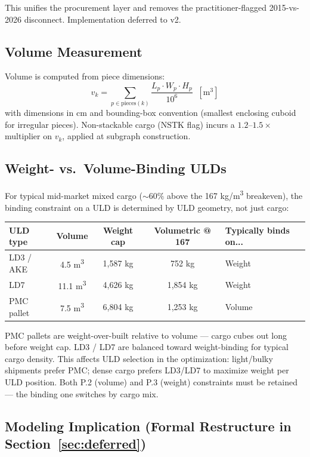 \documentclass[11pt,a4paper]{article}
\theoremstyle{definition}
\begin{document}
This unifies the procurement layer and removes the practitioner-flagged
2015-vs-2026 disconnect. Implementation deferred to v2.

\subsection{Volume Measurement}

Volume is computed from piece dimensions:
\begin{equation*}
  v_k = \sum_{p \in \text{pieces}(k)} \frac{L_p \cdot W_p \cdot H_p}{10^6} \;\;[\text{m}^3]
\end{equation*}
with dimensions in cm and bounding-box convention (smallest enclosing cuboid for
irregular pieces). Non-stackable cargo (NSTK flag) incurs a \(1.2\)--\(1.5\times\)
multiplier on \(v_k\), applied at subgraph construction.

\subsection{Weight- vs.\ Volume-Binding ULDs}

For typical mid-market mixed cargo (\(\sim 60\%\) above the 167 kg/m\textsuperscript{3}
breakeven), the binding constraint on a ULD is determined by ULD geometry, not just
cargo:

\begin{center}
\begin{tabular}{lcccl}
\toprule
ULD type & Volume & Weight cap & Volumetric @ 167 & Typically binds on... \\
\midrule
LD3 / AKE & 4.5 m\textsuperscript{3} & 1{,}587 kg & 752 kg & Weight \\
LD7       & 11.1 m\textsuperscript{3} & 4{,}626 kg & 1{,}854 kg & Weight \\
PMC pallet & 7.5 m\textsuperscript{3} & 6{,}804 kg & 1{,}253 kg & Volume \\
\bottomrule
\end{tabular}
\end{center}

PMC pallets are weight-over-built relative to volume — cargo cubes out long before
weight cap. LD3 / LD7 are balanced toward weight-binding for typical cargo density.
This affects ULD selection in the optimization: light/bulky shipments prefer PMC;
dense cargo prefers LD3/LD7 to maximize weight per ULD position. Both P.2 (volume)
and P.3 (weight) constraints must be retained — the binding one switches by cargo
mix.

\subsection{Modeling Implication (Formal Restructure in Section~\ref{sec:deferred})}
\end{document}
